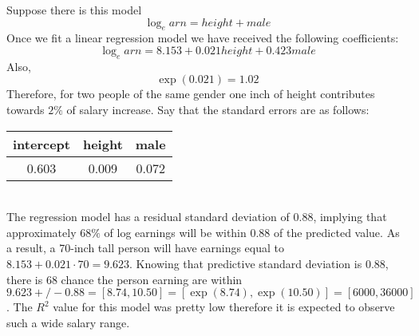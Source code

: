 \documentclass{article}
\begin{document}
Suppose there is this model
\begin{equation}
\log_earn = height + male
\end{equation}
Once we fit a linear regression model we have received the following coefficients:
\begin{equation}
\log_earn = 8.153 + 0.021height + 0.423male
\end{equation}
Also,
\begin{equation}
 \exp(0.021) = 1.02
\end{equation}
Therefore, for two people of the same gender one inch of height contributes towards $2\%$ of salary increase. Say that the standard errors are as follows:
\begin{tabular}{|c|c|c|}
\hline 
intercept& height & male \\ \hline 
0.603 & 0.009  & 0.072\\ 
\hline 
\end{tabular} 
\\
\indent
The regression model has a residual standard deviation of $0.88$, implying that approximately $68\%$ of log earnings will be within $0.88$ of the predicted value. As a result, a 70-inch tall person will have earnings equal to $8.153 + 0.021 \cdot 70 = 9.623$. Knowing that predictive standard deviation is $0.88$, there is $68$ chance the person earning are within $9.623 +/- 0.88= [8.74, 10.50]= [\exp(8.74), \exp(10.50)] = [6000, 36000]$. The $R^2$ value for this model was pretty low therefore it is expected to observe such a wide salary range.
\end{document}
